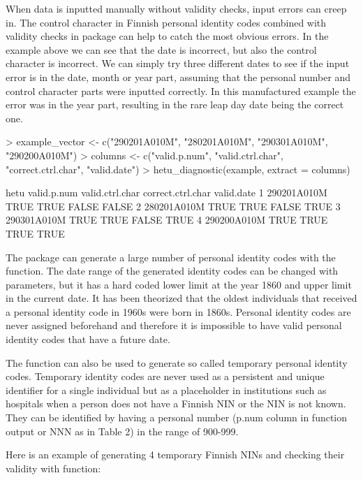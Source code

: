 When data is inputted manually without validity checks, input errors can creep in. The control character in Finnish personal identity codes combined with validity checks in  package can help to catch the most obvious errors. In the example above we can see that the date is incorrect, but also the control character is incorrect. We can simply try three different dates to see if the input error is in the date, month or year part, assuming that the personal number and control character parts were inputted correctly. In this manufactured example the error was in the year part, resulting in the rare leap day date being the correct one.

\begin{example}
  > example_vector <- c("290201A010M", "280201A010M", "290301A010M", "290200A010M")
  > columns <- c("valid.p.num", "valid.ctrl.char", "correct.ctrl.char", "valid.date")
  > hetu_diagnostic(example, extract = columns)
  
           hetu valid.p.num valid.ctrl.char correct.ctrl.char valid.date
  1 290201A010M        TRUE            TRUE             FALSE      FALSE
  2 280201A010M        TRUE            TRUE             FALSE       TRUE
  3 290301A010M        TRUE            TRUE             FALSE       TRUE
  4 290200A010M        TRUE            TRUE              TRUE       TRUE
\end{example}

The  package can generate a large number of personal identity codes with the  function. The date range of the generated identity codes can be changed with parameters, but it has a hard coded lower limit at the year 1860 and upper limit in the current date. It has been theorized that the oldest individuals that received a personal identity code in 1960s were born in 1860s. Personal identity codes are never assigned beforehand and therefore it is impossible to have valid personal identity codes that have a future date.

The function can also be used to generate so called temporary personal identity codes. Temporary identity codes are never used as a persistent and unique identifier for a single individual but as a placeholder in institutions such as hospitals when a person does not have a Finnish NIN or the NIN is not known. They can be identified by having a personal number (p.num column in  function output or NNN as in Table 2) in the range of 900-999.

Here is an example of generating 4 temporary Finnish NINs and checking their validity with  function:

